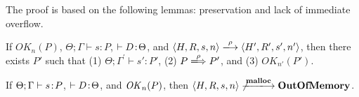 
The proof is based on the following lemmas: preservation and lack of
immediate overflow.

\begin{lemma}[Preservation]
\label{lem:preservation}
If $OK_{n}(P)$, $\Theta; \Gamma \vdash s : P$, \(\vdash D \!:\!
\Theta\), and $\langle H,R,s,n \rangle \xlongrightarrow{\rho} \langle
H',R',s', n' \rangle$, then there exists $P'$ such that (1) $ \Theta;
\Gamma^{'} \vdash s' : P'$, (2) \(P \xLongrightarrow{\rho} P'\), and (3)
\(OK_{n'}(P')\).
\end{lemma}


\begin{lemma}
\label{lem:immediateSafety}
If $\Theta; \Gamma \vdash s \!:\! P$, \(\vdash D \!:\! \Theta\), and
\(\mathit{OK}_n(P)\), then $\langle H, R, s, n \rangle
\not\xlongrightarrow{\Malloc} \OVERFLOW$.
\end{lemma}
